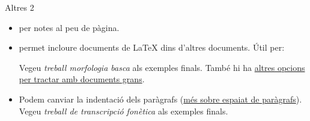 \begin{frame}[fragile]{Altres 2}
\begin{itemize}
    \item {} per notes al peu de pàgina.
    \item {} permet incloure documents de \LaTeX{} dins d'altres documents.
    Útil per:
        \footnotesize{Vegeu \textit{treball morfologia basca} als exemples finals.}
        També hi ha
        \href{https://www.overleaf.com/learn/latex/Management_in_a_large_project}{altres opcions per tractar amb documents grans}.
    \item \normalsize Podem canviar la indentació dels paràgrafs (\href{https://www.overleaf.com/learn/latex/Articles/How_to_change_paragraph_spacing_in_LaTeX}{més sobre espaiat de paràgrafs}). \\
    \footnotesize{Vegeu \textit{treball de transcripció fonètica} als exemples finals.}
\begin{exampletiny}
\setlength{\parindent}{0pt}
\setlength{\parskip}{\baselineskip}
\end{exampletiny}
\end{itemize}
\end{frame}

